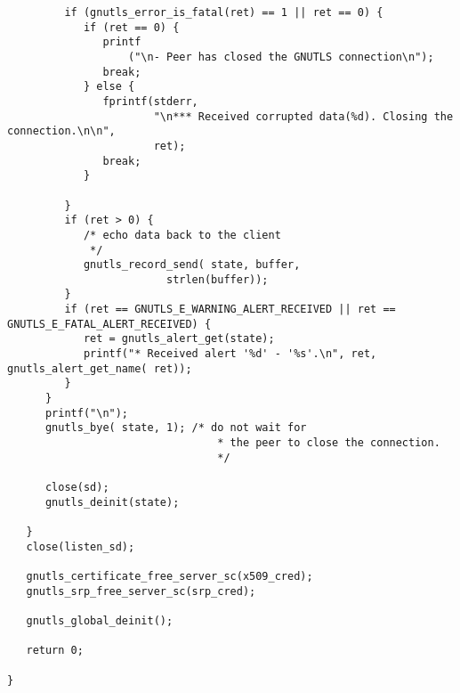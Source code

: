\begin{verbatim}
         if (gnutls_error_is_fatal(ret) == 1 || ret == 0) {
            if (ret == 0) {
               printf
                   ("\n- Peer has closed the GNUTLS connection\n");
               break;
            } else {
               fprintf(stderr,
                       "\n*** Received corrupted data(%d). Closing the connection.\n\n",
                       ret);
               break;
            }

         }
         if (ret > 0) {
            /* echo data back to the client
             */
            gnutls_record_send( state, buffer,
                         strlen(buffer));
         }
         if (ret == GNUTLS_E_WARNING_ALERT_RECEIVED || ret == GNUTLS_E_FATAL_ALERT_RECEIVED) {
            ret = gnutls_alert_get(state);
            printf("* Received alert '%d' - '%s'.\n", ret, gnutls_alert_get_name( ret));
         }
      }
      printf("\n");
      gnutls_bye( state, 1); /* do not wait for
                                 * the peer to close the connection.
                                 */

      close(sd);
      gnutls_deinit(state);

   }
   close(listen_sd);

   gnutls_certificate_free_server_sc(x509_cred);
   gnutls_srp_free_server_sc(srp_cred);

   gnutls_global_deinit();

   return 0;

}

\end{verbatim}
